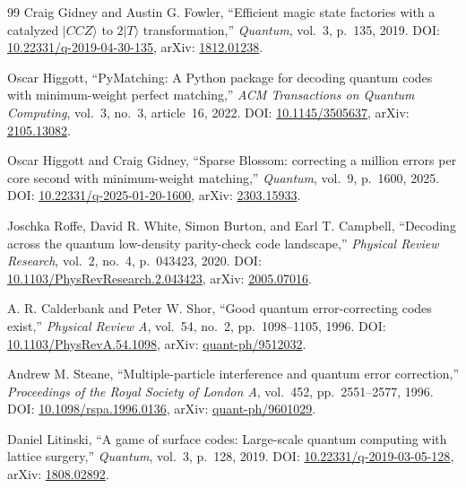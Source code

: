 \begin{thebibliography}{99}
Craig Gidney and Austin G. Fowler, ``Efficient magic state factories with a catalyzed $\lvert CCZ\rangle$ to $2\lvert T\rangle$ transformation,'' \emph{Quantum}, vol.~3, p.~135, 2019. DOI: \href{https://doi.org/10.22331/q-2019-04-30-135}{10.22331/q-2019-04-30-135}, arXiv: \href{https://arxiv.org/abs/1812.01238}{1812.01238}.

Oscar Higgott, ``PyMatching: A Python package for decoding quantum codes with minimum-weight perfect matching,'' \emph{ACM Transactions on Quantum Computing}, vol.~3, no.~3, article~16, 2022. DOI: \href{https://doi.org/10.1145/3505637}{10.1145/3505637}, arXiv: \href{https://arxiv.org/abs/2105.13082}{2105.13082}.

Oscar Higgott and Craig Gidney, ``Sparse Blossom: correcting a million errors per core second with minimum-weight matching,'' \emph{Quantum}, vol.~9, p.~1600, 2025. DOI: \href{https://doi.org/10.22331/q-2025-01-20-1600}{10.22331/q-2025-01-20-1600}, arXiv: \href{https://arxiv.org/abs/2303.15933}{2303.15933}.

Joschka Roffe, David R. White, Simon Burton, and Earl T. Campbell, ``Decoding across the quantum low-density parity-check code landscape,'' \emph{Physical Review Research}, vol.~2, no.~4, p.~043423, 2020. DOI: \href{https://doi.org/10.1103/PhysRevResearch.2.043423}{10.1103/PhysRevResearch.2.043423}, arXiv: \href{https://arxiv.org/abs/2005.07016}{2005.07016}.

A. R. Calderbank and Peter W. Shor, ``Good quantum error-correcting codes exist,'' \emph{Physical Review A}, vol.~54, no.~2, pp.~1098--1105, 1996. DOI: \href{https://doi.org/10.1103/PhysRevA.54.1098}{10.1103/PhysRevA.54.1098}, arXiv: \href{https://arxiv.org/abs/quant-ph/9512032}{quant-ph/9512032}.

Andrew M. Steane, ``Multiple-particle interference and quantum error correction,'' \emph{Proceedings of the Royal Society of London A}, vol.~452, pp.~2551--2577, 1996. DOI: \href{https://doi.org/10.1098/rspa.1996.0136}{10.1098/rspa.1996.0136}, arXiv: \href{https://arxiv.org/abs/quant-ph/9601029}{quant-ph/9601029}.

Daniel Litinski, ``A game of surface codes: Large-scale quantum computing with lattice surgery,'' \emph{Quantum}, vol.~3, p.~128, 2019. DOI: \href{https://doi.org/10.22331/q-2019-03-05-128}{10.22331/q-2019-03-05-128}, arXiv: \href{https://arxiv.org/abs/1808.02892}{1808.02892}.


\end{thebibliography}
